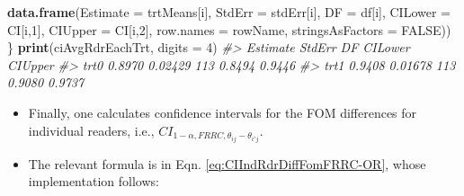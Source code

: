 \documentclass[
]{book}
\newenvironment{Shaded}{\begin{snugshade}}{\end{snugshade}}
\newcommand{\CommentTok}[1]{\textcolor[rgb]{0.56,0.35,0.01}{\textit{#1}}}
\newcommand{\DataTypeTok}[1]{\textcolor[rgb]{0.13,0.29,0.53}{#1}}
\newcommand{\DecValTok}[1]{\textcolor[rgb]{0.00,0.00,0.81}{#1}}
\newcommand{\KeywordTok}[1]{\textcolor[rgb]{0.13,0.29,0.53}{\textbf{#1}}}
\newcommand{\NormalTok}[1]{#1}
\newcommand{\OtherTok}[1]{\textcolor[rgb]{0.56,0.35,0.01}{#1}}
\providecommand{\tightlist}{%
  \setlength{\itemsep}{0pt}\setlength{\parskip}{0pt}}
\begin{document}
\begin{Shaded}
\begin{Highlighting}[]
          \KeywordTok{data.frame}\NormalTok{(}\DataTypeTok{Estimate =}\NormalTok{ trtMeans[i], }
                     \DataTypeTok{StdErr =}\NormalTok{ stdErr[i],}
                     \DataTypeTok{DF =}\NormalTok{ df[i],}
                     \DataTypeTok{CILower =}\NormalTok{ CI[i,}\DecValTok{1}\NormalTok{],}
                     \DataTypeTok{CIUpper =}\NormalTok{ CI[i,}\DecValTok{2}\NormalTok{],}
                     \DataTypeTok{row.names =}\NormalTok{ rowName,}
                     \DataTypeTok{stringsAsFactors =} \OtherTok{FALSE}\NormalTok{))}
\NormalTok{\}}
\KeywordTok{print}\NormalTok{(ciAvgRdrEachTrt, }\DataTypeTok{digits =} \DecValTok{4}\NormalTok{)}
\CommentTok{\#\textgreater{}      Estimate  StdErr  DF CILower CIUpper}
\CommentTok{\#\textgreater{} trt0   0.8970 0.02429 113  0.8494  0.9446}
\CommentTok{\#\textgreater{} trt1   0.9408 0.01678 113  0.9080  0.9737}
\end{Highlighting}
\end{Shaded}

\begin{itemize}
\tightlist
\item
  Finally, one calculates confidence intervals for the FOM differences for individual readers, i.e., \(CI_{1-\alpha,FRRC,\theta_{i j} - \theta_{i' j}}\).
\item
  The relevant formula is in Eqn. \eqref{eq:CIIndRdrDiffFomFRRC-OR}, whose implementation follows:
\end{itemize}
\end{document}

